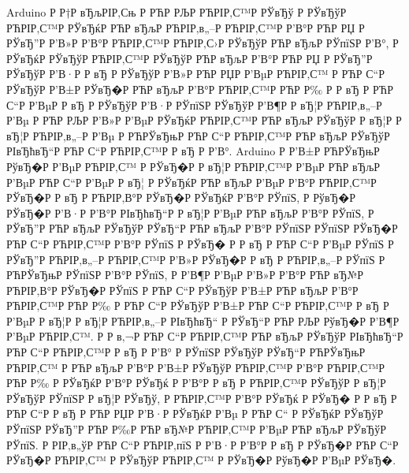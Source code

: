 \documentclass[a4paper,14pt]{extarticle}
\begin{document}
Arduino Р Р†Р вЂљРІР‚Сњ Р РЋР РЉР РЋРІР‚С™Р  РЎвЂў Р  РЎвЂўР РЋРІР‚С™Р  РЎвЂќР РЋР вЂљР РЋРІР‚в„–Р РЋРІР‚С™Р  Р’В°Р РЋР РЏ Р  РЎвЂ”Р  Р’В»Р  Р’В°Р РЋРІР‚С™Р РЋРІР‚С›Р  РЎвЂўР РЋР вЂљР  РЎпїЅР  Р’В°, Р  РЎвЂќР  РЎвЂўР РЋРІР‚С™Р  РЎвЂўР РЋР вЂљР  Р’В°Р РЋР РЏ Р  РЎвЂ”Р  РЎвЂўР  Р’В·Р  Р вЂ Р  РЎвЂўР  Р’В»Р РЋР РЏР  Р’ВµР РЋРІР‚С™ Р РЋР С“Р  РЎвЂўР  Р’В±Р  РЎвЂ�Р РЋР вЂљР  Р’В°Р РЋРІР‚С™Р РЋР Р‰ Р  Р вЂ Р РЋР С“Р  Р’ВµР  Р вЂ Р  РЎвЂўР  Р’В·Р  РЎпїЅР  РЎвЂўР  Р’В¶Р  Р вЂ¦Р РЋРІР‚в„–Р  Р’Вµ Р РЋР РЉР  Р’В»Р  Р’ВµР  РЎвЂќР РЋРІР‚С™Р РЋР вЂљР  РЎвЂўР  Р вЂ¦Р  Р вЂ¦Р РЋРІР‚в„–Р  Р’Вµ Р РЋРЎвЂњР РЋР С“Р РЋРІР‚С™Р РЋР вЂљР  РЎвЂўР  РІвЂћвЂ“Р РЋР С“Р РЋРІР‚С™Р  Р вЂ Р  Р’В°. Arduino Р  Р’В±Р РЋРЎвЂњР  РўвЂ�Р  Р’ВµР РЋРІР‚С™ Р  РЎвЂ�Р  Р вЂ¦Р РЋРІР‚С™Р  Р’ВµР РЋР вЂљР  Р’ВµР РЋР С“Р  Р’ВµР  Р вЂ¦ Р  РЎвЂќР РЋР вЂљР  Р’ВµР  Р’В°Р РЋРІР‚С™Р  РЎвЂ�Р  Р вЂ Р РЋРІР‚В°Р  РЎвЂ�Р  РЎвЂќР  Р’В°Р  РЎпїЅ, Р  РўвЂ�Р  РЎвЂ�Р  Р’В·Р  Р’В°Р  РІвЂћвЂ“Р  Р вЂ¦Р  Р’ВµР РЋР вЂљР  Р’В°Р  РЎпїЅ, Р  РЎвЂ”Р РЋР вЂљР  РЎвЂўР  РЎвЂ“Р РЋР вЂљР  Р’В°Р  РЎпїЅР  РЎпїЅР  РЎвЂ�Р РЋР С“Р РЋРІР‚С™Р  Р’В°Р  РЎпїЅ Р  РЎвЂ� Р  Р вЂ Р РЋР С“Р  Р’ВµР  РЎпїЅ Р  РЎвЂ”Р РЋРІР‚в„–Р РЋРІР‚С™Р  Р’В»Р  РЎвЂ�Р  Р вЂ Р РЋРІР‚в„–Р  РЎпїЅ Р РЋРЎвЂњР  РЎпїЅР  Р’В°Р  РЎпїЅ, Р  Р’В¶Р  Р’ВµР  Р’В»Р  Р’В°Р РЋР вЂ№Р РЋРІР‚В°Р  РЎвЂ�Р  РЎпїЅ Р РЋР С“Р  РЎвЂўР  Р’В±Р РЋР вЂљР  Р’В°Р РЋРІР‚С™Р РЋР Р‰ Р РЋР С“Р  РЎвЂўР  Р’В±Р РЋР С“Р РЋРІР‚С™Р  Р вЂ Р  Р’ВµР  Р вЂ¦Р  Р вЂ¦Р РЋРІР‚в„–Р  РІвЂћвЂ“ Р  РЎвЂ“Р РЋР РЉР  РўвЂ�Р  Р’В¶Р  Р’ВµР РЋРІР‚С™. Р  Р в‚¬Р РЋР С“Р РЋРІР‚С™Р РЋР вЂљР  РЎвЂўР  РІвЂћвЂ“Р РЋР С“Р РЋРІР‚С™Р  Р вЂ Р  Р’В° Р  РЎпїЅР  РЎвЂўР  РЎвЂ“Р РЋРЎвЂњР РЋРІР‚С™ Р РЋР вЂљР  Р’В°Р  Р’В±Р  РЎвЂўР РЋРІР‚С™Р  Р’В°Р РЋРІР‚С™Р РЋР Р‰ Р  РЎвЂќР  Р’В°Р  РЎвЂќ Р  Р’В°Р  Р вЂ Р РЋРІР‚С™Р  РЎвЂўР  Р вЂ¦Р  РЎвЂўР  РЎпїЅР  Р вЂ¦Р  РЎвЂў, Р РЋРІР‚С™Р  Р’В°Р  РЎвЂќ Р  РЎвЂ� Р  Р вЂ  Р РЋР С“Р  Р вЂ Р РЋР РЏР  Р’В·Р  РЎвЂќР  Р’Вµ Р РЋР С“ Р  РЎвЂќР  РЎвЂўР  РЎпїЅР  РЎвЂ”Р РЋР Р‰Р РЋР вЂ№Р РЋРІР‚С™Р  Р’ВµР РЋР вЂљР  РЎвЂўР  РЎпїЅ. Р  РІР‚в„ўР РЋР С“Р РЋРІР‚пїЅ Р  Р’В·Р  Р’В°Р  Р вЂ Р  РЎвЂ�Р РЋР С“Р  РЎвЂ�Р РЋРІР‚С™ Р  РЎвЂўР РЋРІР‚С™ Р  РЎвЂ�Р  РўвЂ�Р  Р’ВµР  РЎвЂ�.
\end{document}
